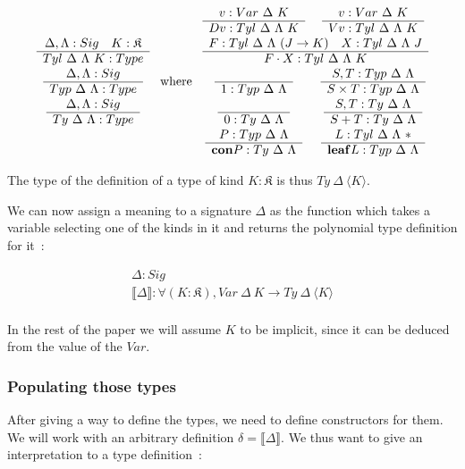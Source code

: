 \documentclass{article}
\newcommand{\lbr}{\llbracket}
\newcommand{\rbr}{\rrbracket}
\newcommand{\sem}[1]{\lbr {#1} \rbr}
\newcommand{\msig}[1]{\langle {#1} \rangle}
\newcommand{\K}{\mathfrak{K}}
\newcommand{\con}{\mathbf{con}}
\newcommand{\lf}{\mathbf{leaf}}
\newcommand{\irule}[2]{\begin{array}{c} {#1} \\\hline {#2}\\ \end{array}}
\begin{document}
\[  \begin{array}{c}
        \irule{\Delta, \Lambda : Sig\quad K : \K}{Tyl\ \Delta\ \Lambda\ K : Type} \\
        \irule{\Delta, \Lambda : Sig}{Typ\ \Delta\ \Lambda : Type} \\
        \irule{\Delta, \Lambda : Sig}{Ty\ \Delta\ \Lambda : Type} \\
    \end{array}
    \text{ where }
    \begin{array}{cc}
        \irule{v : Var\ \Delta\ K}{Dv : Tyl\ \Delta\ \Lambda\ K}
            & \irule{v : Var\ \Delta\ K}{Vv : Tyl\ \Delta\ \Lambda\ K} \\
        \multicolumn{2}{c}{\irule{F : Tyl\ \Delta\ \Lambda\ (J\rightarrow K)\quad
                X : Tyl\ \Delta\ \Lambda\ J}
            {F\cdot X : Tyl\ \Delta\ \Lambda\ K}} \\
        \irule{}{1 : Typ\ \Delta\ \Lambda}
            & \irule{S, T : Typ\ \Delta\ \Lambda}{S \times T : Typ\ \Delta\ \Lambda} \\
        \irule{}{0 : Ty\ \Delta\ \Lambda}
            & \irule{S, T : Ty\ \Delta\ \Lambda}{S + T : Ty\ \Delta\ \Lambda} \\
        \irule{P : Typ\ \Delta\ \Lambda}{\con P : Ty\ \Delta\ \Lambda}
            & \irule{L : Tyl\ \Delta\ \Lambda\ *}{\lf L : Typ\ \Delta\ \Lambda} \\
    \end{array}
\]

The type of the definition of a type of kind $K:\K$ is thus $Ty\ \Delta\ \msig{K}$.

We can now assign a meaning to a signature $\Delta$ as the function which takes
a variable selecting one of the kinds in it and returns the polynomial type
definition for it~:

\[\irule{\Delta : Sig}{\sem{\Delta} : \forall (K : \K), Var\ \Delta\ K\rightarrow
Ty\ \Delta\ \msig{K}} \]

In the rest of the paper we will assume $K$ to be implicit, since it can be
deduced from the value of the $Var$.

\subsubsection{Populating those types}

After giving a way to define the types, we need to define constructors for
them. We will work with an arbitrary definition $\delta = \sem{\Delta}$. We
thus want to give an interpretation to a type definition~:
\end{document}
